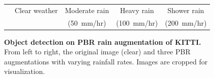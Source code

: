 \begin{figure}
\begin{tabular}{ccccc}
  & Clear weather & Moderate rain & Heavy rain     & Shower rain \\
  &    & (50~mm/hr)  & (100~mm/hr)   & (200~mm/hr) \\
 \end{tabular}
 \caption{\textbf{Object detection on PBR rain augmentation of KITTI.} From left to right, the original image (clear) and three PBR augmentations with varying rainfall rates. Images are cropped for visualization.}
 \label{fig:eval_qualitative_objdet}
\end{figure}

\renewcommand\weatherAugmented[4]{
 \adjincludegraphics[width=0.222\linewidth]{figures/results/qualitative_rain/#2/clear/#1.#3} \hspace{0.085em} &
 \adjincludegraphics[width=0.222\linewidth]{figures/results/qualitative_rain/#2/pbr/50mm/#1.#4} & 
 \adjincludegraphics[width=0.222\linewidth]{figures/results/qualitative_rain/#2/pbr/100mm/#1.#4} & 
 \adjincludegraphics[width=0.222\linewidth]{figures/results/qualitative_rain/#2/pbr/200mm/#1.#4}}

